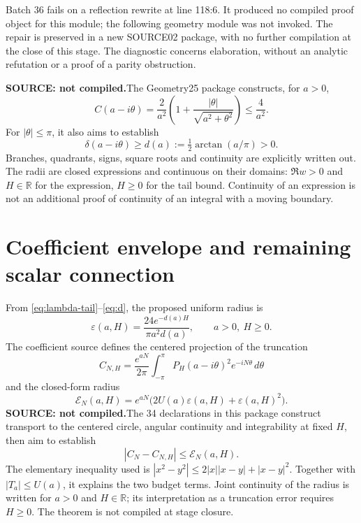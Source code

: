 \documentclass[11pt,a4paper]{article}
\theoremstyle{remark}
\newcommand{\R}{\mathbb R}
\newcommand{\source}{\textbf{SOURCE: not compiled.}\space}
\begin{document}
Batch 36 fails on a reflection rewrite at line 118:6. It produced no compiled
proof object for this module; the following geometry module was not invoked.
The repair is preserved in a new SOURCE02 package, with no further compilation
at the close of this stage. The diagnostic concerns elaboration, without
an analytic refutation or a proof of a parity obstruction.

\source The Geometry25 package constructs, for $a>0$,
\begin{equation}\label{eq:geometry}
C(a-i\theta)=\frac2{a^2}
\left(1+\frac{|\theta|}{\sqrt{a^2+\theta^2}}\right)\le\frac4{a^2}.
\end{equation}
For $|\theta|\le\pi$, it also aims to establish
\begin{equation}\label{eq:d}
\delta(a-i\theta)\ge d(a):=\tfrac12\arctan(a/\pi)>0.
\end{equation}
Branches, quadrants, signs, square roots and continuity are explicitly
written out. The radii are closed expressions and continuous on their domains:
$\Re w>0$ and $H\in\R$ for the expression, $H\ge0$ for the tail bound.
Continuity of an expression is not an additional proof of continuity of
an integral with a moving boundary.

\clearpage
\section{Coefficient envelope and remaining scalar connection}\label{sec:radius}
From \eqref{eq:lambda-tail}--\eqref{eq:d}, the proposed uniform radius is
\begin{equation}\label{eq:eps}
\varepsilon(a,H)=\frac{24e^{-d(a)H}}{\pi a^2d(a)},\qquad a>0,\ H\ge0.
\end{equation}
The coefficient source defines the centered projection of the truncation
\[
C_{N,H}=\frac{e^{aN}}{2\pi}\int_{-\pi}^{\pi}
P_H(a-i\theta)^2e^{-iN\theta}\,d\theta
\]
and the closed-form radius
\begin{equation}\label{eq:E-mellin}
\mathcal E_N(a,H)=e^{aN}\bigl(2U(a)\varepsilon(a,H)
+\varepsilon(a,H)^2\bigr).
\end{equation}
\source The 34 declarations in this package construct transport to the
centered circle, angular continuity and integrability at fixed $H$, then
aim to establish
\begin{equation}\label{eq:coef-error}
|C_N-C_{N,H}|\le\mathcal E_N(a,H).
\end{equation}
The elementary inequality used is
$|x^2-y^2|\le2|x||x-y|+|x-y|^2$. Together with $|T_a|\le U(a)$, it explains
the two budget terms. Joint continuity of the radius is written for $a>0$
and $H\in\R$; its interpretation as a truncation error requires $H\ge0$.
The theorem is not compiled at stage closure.
\end{document}
